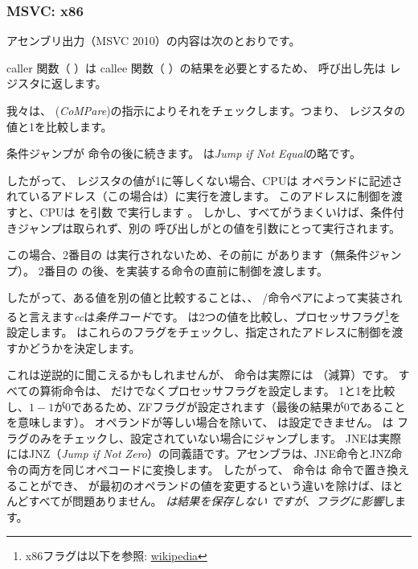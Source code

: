 \subsubsection{MSVC: x86}

アセンブリ出力（MSVC 2010）の内容は次のとおりです。



\gls{caller} 関数（ \main ）は \gls{callee} 関数（ \scanf ）の結果を必要とするため、
呼び出し先は \EAX レジスタに返します。

我々は、 (\emph{CoMPare})の指示によりそれをチェックします。つまり、 \EAX レジスタの値と1を比較します。

\JNE 条件ジャンプが \CMP 命令の後に続きます。  \JNE は\emph{Jump if Not Equal}の略です。

したがって、 \EAX レジスタの値が1に等しくない場合、\ac{CPU}は \JNE オペランドに記述されているアドレス（この場合は）に実行を渡します。
このアドレスに制御を渡すと、\ac{CPU}は \printf を引数 で実行します 。
しかし、すべてがうまくいけば、条件付きジャンプは取られず、別の \printf 呼び出しがとの値を引数にとって実行されます。

この場合、2番目の \printf は実行されないため、その前に \JMP があります（無条件ジャンプ）。
2番目の \printf の後、を実装する命令の直前に制御を渡します。

したがって、ある値を別の値と比較することは、、 \CMP/\Jcc 命令ペアによって実装されると言えます\emph{cc}は\emph{条件コード}です。 
\CMP は2つの値を比較し、プロセッサフラグ\footnote{x86フラグは以下を参照: \href{http://go.yurichev.com/17120}{wikipedia}}を設定します。 
\Jcc はこれらのフラグをチェックし、指定されたアドレスに制御を渡すかどうかを決定します。

\label{CMPandSUB}
これは逆説的に聞こえるかもしれませんが、 \CMP 命令は実際には \SUB （減算）です。
すべての算術命令は、 \CMP だけでなくプロセッサフラグを設定します。 1と1を比較し、$1-1$が0であるため、ZFフラグが設定されます（最後の結果が0であることを意味します）。
オペランドが等しい場合を除いて、 \ZF は設定できません。  \JNE は \ZF フラグのみをチェックし、設定されていない場合にジャンプします。 
JNEは実際にはJNZ（\emph{Jump if Not Zero}）の同義語です。アセンブラは、JNE命令とJNZ命令の両方を同じオペコードに変換します。
したがって、 \CMP 命令は \SUB 命令で置き換えることができ、 \SUB が最初のオペランドの値を変更するという違いを除けば、ほとんどすべてが問題ありません。 
\CMP \emph{は結果を保存しない \SUB ですが、フラグに影響}します。


